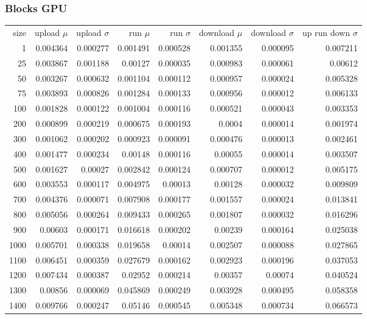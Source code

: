 \subsubsection{Blocks GPU}

\begin{tabular}{r r r r r r r r}
size & upload $\mu$  & upload $\sigma$ & run $\mu$ & run $\sigma$ & download $\mu$ & download $\sigma$ & up run down $\sigma$ \\
1 & 0.004364 & 0.000277 & 0.001491 & 0.000528 & 0.001355 & 0.000095 & 0.007211 \\
25 & 0.003867 & 0.001188 & 0.00127 & 0.000035 & 0.000983 & 0.000061 & 0.00612 \\
50 & 0.003267 & 0.000632 & 0.001104 & 0.000112 & 0.000957 & 0.000024 & 0.005328 \\
75 & 0.003893 & 0.000826 & 0.001284 & 0.000133 & 0.000956 & 0.000012 & 0.006133 \\
100 & 0.001828 & 0.000122 & 0.001004 & 0.000116 & 0.000521 & 0.000043 & 0.003353 \\
200 & 0.000899 & 0.000219 & 0.000675 & 0.000193 & 0.0004 & 0.000014 & 0.001974 \\
300 & 0.001062 & 0.000202 & 0.000923 & 0.000091 & 0.000476 & 0.000013 & 0.002461 \\
400 & 0.001477 & 0.000234 & 0.00148 & 0.000116 & 0.00055 & 0.000014 & 0.003507 \\
500 & 0.001627 & 0.00027 & 0.002842 & 0.000124 & 0.000707 & 0.000012 & 0.005175 \\
600 & 0.003553 & 0.000117 & 0.004975 & 0.00013 & 0.00128 & 0.000032 & 0.009809 \\
700 & 0.004376 & 0.000071 & 0.007908 & 0.000177 & 0.001557 & 0.000024 & 0.013841 \\
800 & 0.005056 & 0.000264 & 0.009433 & 0.000265 & 0.001807 & 0.000032 & 0.016296 \\
900 & 0.00603 & 0.000171 & 0.016618 & 0.000202 & 0.00239 & 0.000164 & 0.025038 \\
1000 & 0.005701 & 0.000338 & 0.019658 & 0.00014 & 0.002507 & 0.000088 & 0.027865 \\
1100 & 0.006451 & 0.000359 & 0.027679 & 0.000162 & 0.002923 & 0.000196 & 0.037053 \\
1200 & 0.007434 & 0.000387 & 0.02952 & 0.000214 & 0.00357 & 0.00074 & 0.040524 \\
1300 & 0.00856 & 0.000069 & 0.045869 & 0.000249 & 0.003928 & 0.000495 & 0.058358 \\
1400 & 0.009766 & 0.000247 & 0.05146 & 0.000545 & 0.005348 & 0.000734 & 0.066573 \\

\end{tabular}
